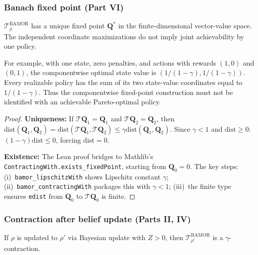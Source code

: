 \subsubsection{Banach fixed point (Part VI)}

\begin{corollary}
\label{cor:fixed_point}
$\mathcal{T}^{\mathrm{BAMOR}}_\rho$ has a unique fixed point $\mathbf Q^*$ in the finite-dimensional vector-value space. The independent coordinate maximizations do not imply joint achievability by one policy.

For example, with one state, zero penalties, and actions with rewards $(1,0)$ and $(0,1)$, the componentwise optimal state value is $(1/(1-\gamma),1/(1-\gamma))$. Every realizable policy has the sum of its two state-value coordinates equal to $1/(1-\gamma)$. Thus the componentwise fixed-point construction must not be identified with an achievable Pareto-optimal policy.
\end{corollary}

\begin{proof}
\textbf{Uniqueness:} If $\mathcal{T}\mathbf{Q}_1 = \mathbf{Q}_1$ and $\mathcal{T}\mathbf{Q}_2 = \mathbf{Q}_2$, then $\mathrm{dist}(\mathbf{Q}_1, \mathbf{Q}_2) = \mathrm{dist}(\mathcal{T}\mathbf{Q}_1, \mathcal{T}\mathbf{Q}_2) \le \gamma \mathrm{dist}(\mathbf{Q}_1, \mathbf{Q}_2)$.  Since $\gamma < 1$ and $\mathrm{dist} \ge 0$: $(1 - \gamma)\mathrm{dist} \le 0$, forcing $\mathrm{dist} = 0$.

\textbf{Existence:} The Lean proof bridges to Mathlib's \texttt{ContractingWith.exists\_fixedPoint}, starting from $\mathbf{Q}_0 = 0$.  The key steps: (i)~\texttt{bamor\_lipschitzWith} shows Lipschitz constant $\gamma$; (ii)~\texttt{bamor\_contractingWith} packages this with $\gamma < 1$; (iii)~the finite type ensures \texttt{edist} from $\mathbf{Q}_0$ to $\mathcal{T}\mathbf{Q}_0$ is finite.
\end{proof}

\subsubsection{Contraction after belief update (Parts II, IV)}

\begin{corollary}
If $\rho$ is updated to $\rho'$ via Bayesian update with $Z > 0$, then $\mathcal{T}^{\mathrm{BAMOR}}_{\rho'}$ is a $\gamma$-contraction.
\end{corollary}

